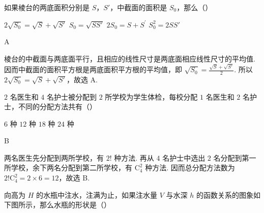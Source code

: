 \begin{problem}
如果棱台的两底面积分别是 \(S\)，\(S'\)，中截面的面积是 \(S_0\)，那么（\quad）

\choices
    {\(2\sqrt{S_0} = \sqrt{S} + \sqrt{S'}\)}
    {\(S_0 = \sqrt{SS'}\)}
    {\(2S_{0} = S + S^{\prime}\)}
    {\(S_0^2 = 2SS'\)}
\end{problem}

\begin{answer}
A
\end{answer}

\begin{solution}
棱台的中截面与两底面平行，且相应的线性尺寸是两底面相应线性尺寸的平均值. 因而中截面的面积平方根是两底面积平方根的平均值，即
\(\sqrt{S_{0}}=\frac{\sqrt{S}+\sqrt{S'}}{2}\). 所以
\(2\sqrt{S_{0}}=\sqrt{S}+\sqrt{S'}\)，故选 A.
\end{solution}

\begin{problem}
\(2\) 名医生和 \(4\) 名护士被分配到 \(2\) 所学校为学生体检，每校分配 \(1\) 名医生和 \(2\) 名护士，不同的分配方法共有（\quad）

\choices
    {\(6\) 种}
    {\(12\) 种}
    {\(18\) 种}
    {\(24\) 种}
\end{problem}

\begin{answer}
B
\end{answer}

\begin{solution}
两名医生先分配到两所学校，有 \(2!\) 种方法. 再从 \(4\) 名护士中选出 \(2\) 名分配到第一所学校，余下两名分配到第二所学校，有 \(\mathrm C_{4}^{2}\) 种方法. 因而总分配方法数为
\(2!\mathrm C_{4}^{2}=2\times6=12\)，故选 B.
\end{solution}

\begin{problem}
向高为 \(H\) 的水瓶中注水，注满为止，如果注水量 \(V\) 与水深 \(h\) 的函数关系的图象如下图所示，那么水瓶的形状是（\quad）


\choices
    {}
    {}
    {}
    {}
\end{problem}

